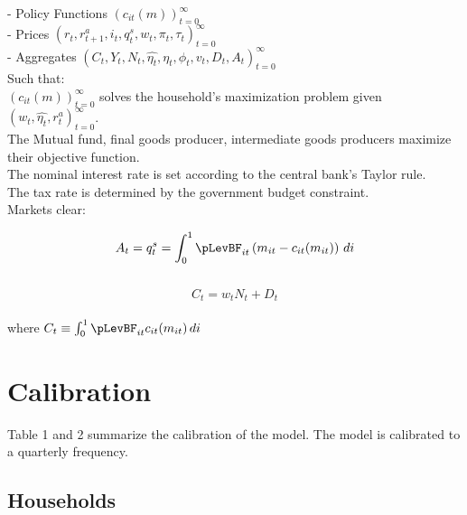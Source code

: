 \documentclass[titlepage]{\econtex}\providecommand{\texname}{Dissertation-Proposal}
\begin{document}
- Policy Functions $\left( c_{it}(m) \right )_{t=0}^{\infty}$ \\

- Prices $ \left(r_{t},  r^{a}_{t+1}, i_{t}, q^{s}_{t},  w_{t} , \pi_{t} , \tau_{t} \right) _{t=0}^{\infty}$\\

- Aggregates $ \left(C_{t}, Y_{t} , N_{t}, \hat{\eta_{t}},\eta_{t}, \phi_{t}, v_{t},  D_{t} , A_{t}  \right)_{t=0}^{\infty}$\\

Such that: \\

$ \left(  c_{it}(m)\right)_{t=0}^{\infty}$  solves the household's maximization problem given $  \left( w_{t}, \hat{\eta_{t}},  r^{a}_{t} \right)_{t=0}^{\infty}$.\\

The Mutual fund, final goods producer, intermediate goods producers maximize their objective function. \\

The nominal interest rate is set according to the central bank's Taylor rule. \\

The tax rate is determined by the government budget constraint. \\

Markets clear:

 $$ A_t =  q^{s}_{t} =  \int_{0}^{1} \pLevBF_{it}\left( m_{it} - c_{it}(m_{it})\right) \, di $$\\
 
$$ C_{t} =w_{t}N_{t} + D_{t}   $$\\

 
 where $C_{t} \equiv  \int_{0}^{1} \pLevBF_{it} c_{it}(m_{it})\, di $ \\



\hypertarget{Calibration }{}
\section{Calibration }

Table 1 and 2 summarize the calibration of the model. The model is calibrated to a quarterly frequency. 


\hypertarget{Households }{}
\subsection{Households }
\end{document}
